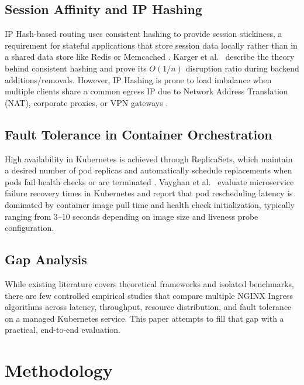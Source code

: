 \documentclass[conference]{IEEEtran}
\begin{document}
\subsection{Session Affinity and IP Hashing}
IP Hash-based routing uses consistent hashing to provide session stickiness, a requirement for stateful applications that store session data locally rather than in a shared data store like Redis or Memcached \cite{thaler2000rfc2991}. Karger et al.~\cite{karger1997consistent} describe the theory behind consistent hashing and prove its $O(1/n)$ disruption ratio during backend additions/removals. However, IP Hashing is prone to load imbalance when multiple clients share a common egress IP due to Network Address Translation (NAT), corporate proxies, or VPN gateways \cite{maggs2015algorithmic}.

\subsection{Fault Tolerance in Container Orchestration}
High availability in Kubernetes is achieved through ReplicaSets, which maintain a desired number of pod replicas and automatically schedule replacements when pods fail health checks or are terminated \cite{k8s_docs}. Vayghan et al.~\cite{vayghan2019microservice} evaluate microservice failure recovery times in Kubernetes and report that pod rescheduling latency is dominated by container image pull time and health check initialization, typically ranging from 3--10 seconds depending on image size and liveness probe configuration.

\subsection{Gap Analysis}
While existing literature covers theoretical frameworks and isolated benchmarks, there are few controlled empirical studies that compare multiple NGINX Ingress algorithms across latency, throughput, resource distribution, and fault tolerance on a managed Kubernetes service. This paper attempts to fill that gap with a practical, end-to-end evaluation.


\section{Methodology}
\end{document}
